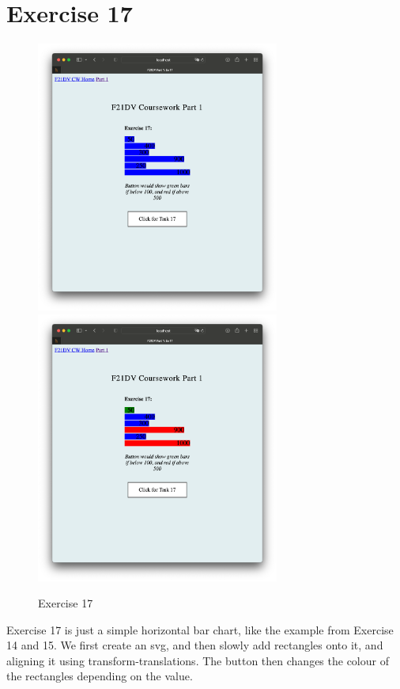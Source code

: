 \documentclass{scrreprt}
\begin{document}
\newpage
\section{Exercise 17}
\begin{figure}[!ht]
    \centering
    \includegraphics[width = 8cm]{images/ex17_1.png}
    \includegraphics[width = 8cm]{images/ex17_2.png}
    \label{fig:ex17}
    \caption{Exercise 17}
\end{figure}
\FloatBarrier
% 
Exercise 17 is just a simple horizontal bar chart, like the example from Exercise 14 and 15. We first
create an svg, and then slowly add rectangles onto it, and aligning it using transform-translations.
The button then changes the colour of the rectangles depending on the value. 

\newpage
\end{document}
